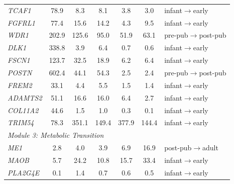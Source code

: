 \begin{table}[H]
\begin{tabular}{lcccccl}
    \textit{TCAF1} & 78.9 & 8.3 & 8.1 & 3.8 & 3.0 & infant$\to$early \\
    \textit{FGFRL1} & 77.4 & 15.6 & 14.2 & 4.3 & 9.5 & infant$\to$early \\
    \textit{WDR1} & 202.9 & 125.6 & 95.0 & 51.9 & 63.1 & pre-pub$\to$post-pub \\
    \textit{DLK1} & 338.8 & 3.9 & 6.4 & 0.7 & 0.6 & infant$\to$early \\
    \textit{FSCN1} & 123.7 & 32.5 & 18.9 & 6.2 & 6.4 & infant$\to$early \\
    \textit{POSTN} & 602.4 & 44.1 & 54.3 & 2.5 & 2.4 & pre-pub$\to$post-pub \\
    \textit{FREM2} & 33.1 & 4.4 & 5.5 & 1.5 & 1.4 & infant$\to$early \\
    \textit{ADAMTS2} & 51.1 & 16.6 & 16.0 & 6.4 & 2.7 & infant$\to$early \\
    \textit{COL11A2} & 44.6 & 1.5 & 1.0 & 0.3 & 0.1 & infant$\to$early \\
    \textit{TRIM54} & 78.3 & 351.1 & 149.4 & 377.9 & 144.4 & infant$\to$early \\
    \midrule
    \multicolumn{7}{l}{\textit{Module 3: Metabolic Transition}} \\
    \textit{ME1} & 2.8 & 4.0 & 3.9 & 6.9 & 16.9 & post-pub$\to$adult \\
    \textit{MAOB} & 5.7 & 24.2 & 10.8 & 15.7 & 33.4 & infant$\to$early \\
    \textit{PLA2G4E} & 0.1 & 1.4 & 0.7 & 0.6 & 0.5 & infant$\to$early \\
    \bottomrule
  \end{tabular}
\end{table}

\clearpage

